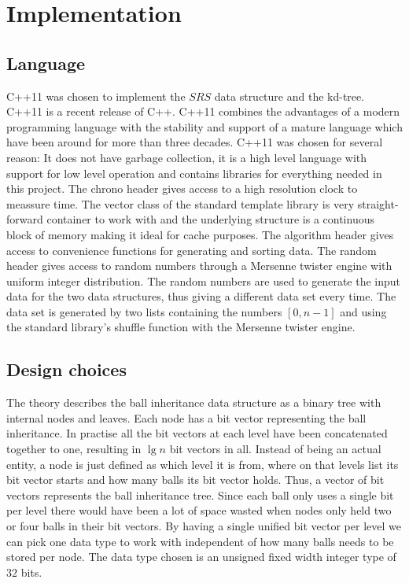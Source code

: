 \chapter{Implementation}

\section{Language}

C++11 was chosen to implement the $SRS$ data structure and the kd-tree. C++11 is a recent release of C++. C++11 combines the advantages of a modern programming language with the stability and support of a mature language which have been around for more than three decades. C++11 was chosen for several reason: It does not have garbage collection, it is a high level language with support for low level operation and contains libraries for everything needed in this project. The chrono header gives access to a high resolution clock to meassure time. The vector class of the standard template library is very straight-forward container to work with and the underlying structure is a continuous block of memory making it ideal for cache purposes. The algorithm header gives access to convenience functions for generating and sorting data. The random header gives access to random numbers through a Mersenne twister engine with uniform integer distribution. The random numbers are used to generate the input data for the two data structures, thus giving a different data set every time. The data set is generated by two lists containing the numbers $[0,n-1]$ and using the standard library's shuffle function with the Mersenne twister engine.

\section{Design choices}

The theory describes the ball inheritance data structure as a binary tree with internal nodes and leaves. Each node has a bit vector representing the ball inheritance. In practise all the bit vectors at each level have been concatenated together to one, resulting in $\lg n$ bit vectors in all. Instead of being an actual entity, a node is just defined as which level it is from, where on that levels list its bit vector starts and how many balls its bit vector holds. Thus, a vector of bit vectors represents the ball inheritance tree. Since each ball only uses a single bit per level there would have been a lot of space wasted when nodes only held two or four balls in their bit vectors. By having a single unified bit vector per level we can pick one data type to work with independent of how many balls needs to be stored per node. The data type chosen is an unsigned fixed width integer type of $32$ bits.

